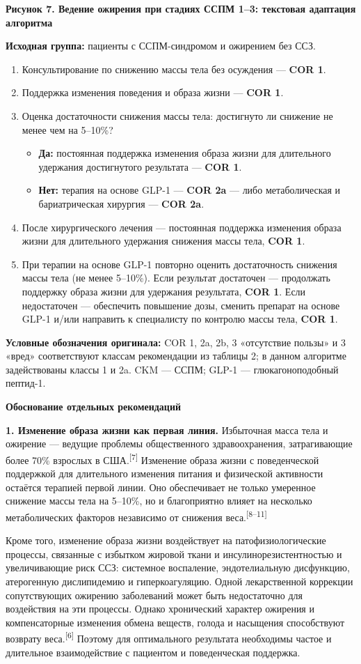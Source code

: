 \documentclass[11pt,a4paper]{article}
\newcommand{\src}[1]{\textsuperscript{[#1]}}
\newcommand{\heading}[1]{\par\medskip\textbf{#1}\par}
\begin{document}
\heading{Рисунок 7. Ведение ожирения при стадиях ССПМ 1--3: текстовая адаптация алгоритма}
\textbf{Исходная группа:} пациенты с ССПМ-синдромом и ожирением без ССЗ.
\begin{enumerate}[label=\arabic*.]
\item Консультирование по снижению массы тела без осуждения --- \textbf{COR 1}.
\item Поддержка изменения поведения и образа жизни --- \textbf{COR 1}.
\item Оценка достаточности снижения массы тела: достигнуто ли снижение не менее чем на 5--10\%?
\begin{itemize}
\item \textbf{Да:} постоянная поддержка изменения образа жизни для длительного удержания достигнутого результата --- \textbf{COR 1}.
\item \textbf{Нет:} терапия на основе GLP-1 --- \textbf{COR 2a} --- либо метаболическая и бариатрическая хирургия --- \textbf{COR 2a}.
\end{itemize}
\item После хирургического лечения --- постоянная поддержка изменения образа жизни для длительного удержания снижения массы тела, \textbf{COR 1}.
\item При терапии на основе GLP-1 повторно оценить достаточность снижения массы тела (не менее 5--10\%). Если результат достаточен --- продолжать поддержку образа жизни для удержания результата, \textbf{COR 1}. Если недостаточен --- обеспечить повышение дозы, сменить препарат на основе GLP-1 и/или направить к специалисту по контролю массы тела, \textbf{COR 1}.
\end{enumerate}
\textbf{Условные обозначения оригинала:} COR 1, 2a, 2b, 3 «отсутствие пользы» и 3 «вред» соответствуют классам рекомендации из таблицы 2; в данном алгоритме задействованы классы 1 и 2a. CKM --- ССПМ; GLP-1 --- глюкагоноподобный пептид-1.

\heading{Обоснование отдельных рекомендаций}
\textbf{1. Изменение образа жизни как первая линия.} Избыточная масса тела и ожирение --- ведущие проблемы общественного здравоохранения, затрагивающие более 70\% взрослых в США.\src{7} Изменение образа жизни с поведенческой поддержкой для длительного изменения питания и физической активности остаётся терапией первой линии. Оно обеспечивает не только умеренное снижение массы тела на 5--10\%, но и благоприятно влияет на несколько метаболических факторов независимо от снижения веса.\src{8--11}

Кроме того, изменение образа жизни воздействует на патофизиологические процессы, связанные с избытком жировой ткани и инсулинорезистентностью и увеличивающие риск ССЗ: системное воспаление, эндотелиальную дисфункцию, атерогенную дислипидемию и гиперкоагуляцию. Одной лекарственной коррекции сопутствующих ожирению заболеваний может быть недостаточно для воздействия на эти процессы. Однако хронический характер ожирения и компенсаторные изменения обмена веществ, голода и насыщения способствуют возврату веса.\src{6} Поэтому для оптимального результата необходимы частое и длительное взаимодействие с пациентом и поведенческая поддержка.
\end{document}
